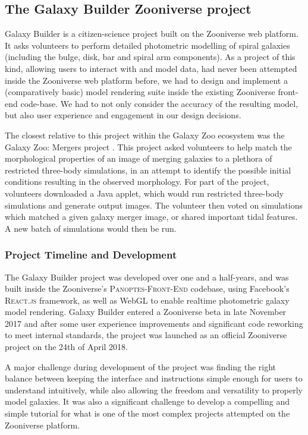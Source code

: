 \documentclass[../main.tex]{subfiles}
\begin{document}
\subsection{The Galaxy Builder Zooniverse project}

Galaxy Builder is a citizen-science project built on the Zooniverse web platform. It asks volunteers to perform detailed photometric modelling of spiral galaxies (including the bulge, disk, bar and spiral arm components). As a project of this kind, allowing users to interact with and model data, had never been attempted inside the Zooniverse web platform before, we had to design and implement a (comparatively basic) model rendering suite inside the existing Zooniverse front-end code-base. We had to not only consider the accuracy of the resulting model, but also user experience and engagement in our design decisions.

The closest relative to this project within the Galaxy Zoo ecosystem was the Galaxy Zoo: Mergers project \citep{Holincheck2016:1604.00435v1}. This project asked volunteers to help match the morphological properties of an image of merging galaxies to a plethora of restricted three-body simulations, in an attempt to identify the possible initial conditions resulting in the observed morphology. For part of the project, volunteers downloaded a Java applet, which would run restricted three-body simulations and generate output images. The volunteer then voted on simulations which matched a given galaxy merger image, or shared important tidal features. A new batch of simulations would then be run.

\subsubsection{Project Timeline and Development}

The Galaxy Builder project was developed over one and a half-years, and was built inside the Zooniverse's \textsc{Panoptes-Front-End} codebase, using Facebook's \textsc{React.js} framework, as well as WebGL to enable realtime photometric galaxy model rendering. Galaxy Builder entered a Zooniverse beta in late November 2017 and after some user experience improvements and significant code reworking to meet internal standards, the project was launched as an official Zooniverse project on the 24th of April 2018.

A major challenge during development of the project was finding the right balance between keeping the interface and instructions simple enough for users to understand intuitively, while also allowing the freedom and versatility to properly model galaxies. It was also a significant challenge to develop a compelling and simple tutorial for what is one of the most complex projects attempted on the Zooniverse platform.
\end{document}
